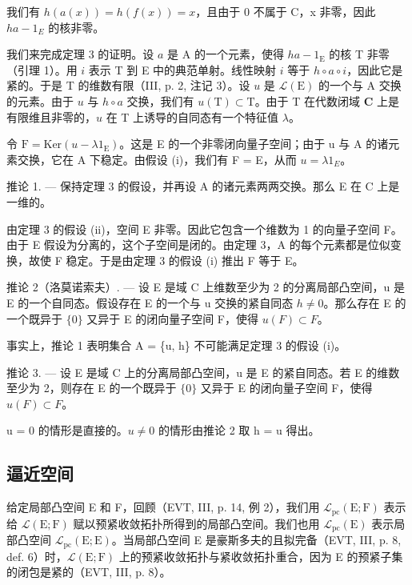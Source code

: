 我们有 \(h(a(x)) = h(f(x)) = x\)，且由于 0 不属于 C，x 非零，因此 \(ha - 1_{E}\) 的核非零。

我们来完成定理 3 的证明。设 \(a\) 是 A 的一个元素，使得 \(ha - 1_{\mathrm{E}}\) 的核 T 非零（引理 1）。用 \(i\) 表示 T 到 E 中的典范单射。线性映射 \(i\) 等于 \(h \circ a \circ i\)，因此它是紧的。于是 T 的维数有限（III, p. 2, 注记 3）。设 \(u\) 是 \(\mathcal{L}(\mathrm{E})\) 的一个与 A 交换的元素。由于 \(u\) 与 \(h \circ a\) 交换，我们有 \(u(\mathrm{T}) \subset \mathrm{T}\)。由于 T 在代数闭域 \(\mathbf{C}\) 上是有限维且非零的，\(u\) 在 T 上诱导的自同态有一个特征值 \(\lambda\)。

令 \(\mathrm{F} = \mathrm{Ker}(u - \lambda1_{\mathrm{E}})\)。这是 E 的一个非零闭向量子空间；由于 u 与 A 的诸元素交换，它在 A 下稳定。由假设 (i)，我们有 F = E，从而 \(u = \lambda1_{E}\)。

推论 1. --- 保持定理 3 的假设，并再设 A 的诸元素两两交换。那么 E 在 C 上是一维的。

由定理 3 的假设 (ii)，空间 E 非零。因此它包含一个维数为 1 的向量子空间 F。由于 E 假设为分离的，这个子空间是闭的。由定理 3，A 的每个元素都是位似变换，故使 F 稳定。于是由定理 3 的假设 (i) 推出 F 等于 E。

推论 2（洛莫诺索夫）. --- 设 E 是域 C 上维数至少为 2 的分离局部凸空间，u 是 E 的一个自同态。假设存在 E 的一个与 u 交换的紧自同态 \(h \neq 0\)。那么存在 E 的一个既异于 \(\{0\}\) 又异于 E 的闭向量子空间 F，使得 \(u(F) \subset F\)。

事实上，推论 1 表明集合 A = \{u, h\} 不可能满足定理 3 的假设 (i)。

推论 3. --- 设 E 是域 C 上的分离局部凸空间，u 是 E 的紧自同态。若 E 的维数至少为 2，则存在 E 的一个既异于 \(\{0\}\) 又异于 E 的闭向量子空间 F，使得 \(u(F) \subset F\)。

u = 0 的情形是直接的。\(u \neq 0\) 的情形由推论 2 取 h = u 得出。

\subsection{逼近空间}

给定局部凸空间 E 和 F，回顾（EVT, III, p. 14, 例 2），我们用 \(\mathcal{L}_{\mathrm{pc}}(\mathrm{E};\mathrm{F})\) 表示给 \(\mathcal{L}(\mathrm{E};\mathrm{F})\) 赋以预紧收敛拓扑所得到的局部凸空间。我们也用 \(\mathcal{L}_{\mathrm{pc}}(\mathrm{E})\) 表示局部凸空间 \(\mathcal{L}_{\mathrm{pc}}(\mathrm{E};\mathrm{E})\)。当局部凸空间 E 是豪斯多夫的且拟完备（EVT, III, p. 8, def. 6）时，\(\mathcal{L}(\mathrm{E};\mathrm{F})\) 上的预紧收敛拓扑与紧收敛拓扑重合，因为 E 的预紧子集的闭包是紧的（EVT, III, p. 8）。

